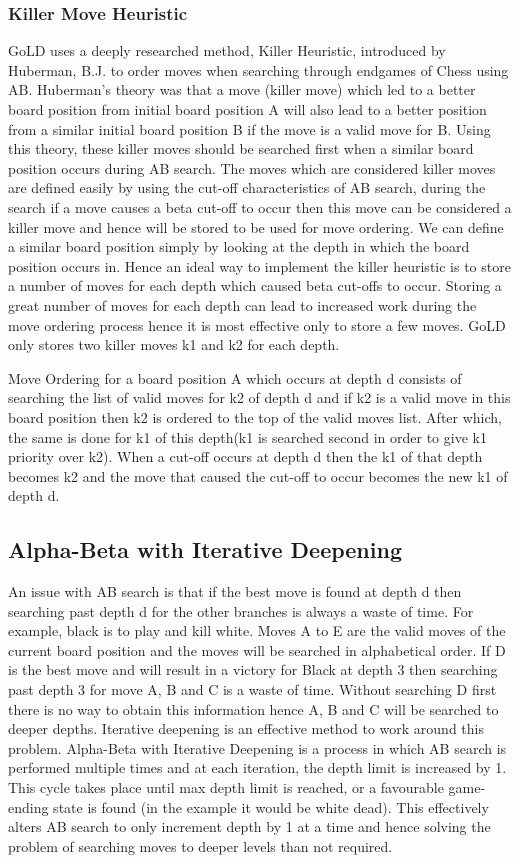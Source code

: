 \documentclass{l4proj}
\begin{document}
\subsubsection{Killer Move Heuristic}
GoLD uses a deeply researched \cite{Akl1977} method, Killer Heuristic, introduced by Huberman, B.J.  \cite{Huberman1968} to order moves when searching through endgames of Chess using AB. Huberman’s theory was that a move (killer move) which led to a better board position from initial board position A will also lead to a better position from a similar initial board position B if the move is a valid move for B.  Using this theory, these killer moves should be searched first when a similar board position occurs during AB search. The moves which are considered killer moves are defined easily by using the cut-off characteristics of AB search, during the search if a move causes a beta cut-off to occur then this move can be considered a killer move and hence will be stored to be used for move ordering.  We can define a similar board position simply by looking at the depth in which the board position occurs in. Hence an ideal way to implement the killer heuristic is to store a number of moves for each depth which caused beta cut-offs to occur. Storing a great number of moves for each depth can lead to increased work during the move ordering process hence it is most effective only to store a few moves. GoLD only stores two killer moves k1 and k2  for each depth.

Move Ordering for a board position A which occurs at depth d consists of searching the list of valid moves for k2 of depth d and if k2 is a valid move in this board position then k2 is ordered to the top of the valid moves list. After which, the same is done for k1 of this depth(k1 is searched second in order to give k1 priority over k2). When a cut-off occurs at depth d then the k1 of that depth becomes k2 and the move that caused the cut-off to occur becomes the new k1 of depth d.

\subsection{Alpha-Beta with Iterative Deepening}
An issue with AB search is that if the best move is found at depth d then searching past depth d for the other branches is always a waste of time. For example,  black is to play and kill white. Moves A to E are the valid moves of the current board position and the moves will be searched in alphabetical order. If D is the best move and will result in a victory for Black at depth 3 then searching past depth 3 for move A, B and C is a waste of time. Without searching D first there is no way to obtain this information hence A, B and C will be searched to deeper depths. Iterative deepening is an effective method to work around this problem. Alpha-Beta with Iterative Deepening is a process in which AB search is performed multiple times and at each iteration, the depth limit is increased by 1. This cycle takes place until max depth limit is reached, or a favourable game-ending state is found  (in the example it would be white dead). This effectively alters AB search to only increment depth by 1 at a time and hence solving the problem of searching moves to deeper levels than not required.
\end{document}
